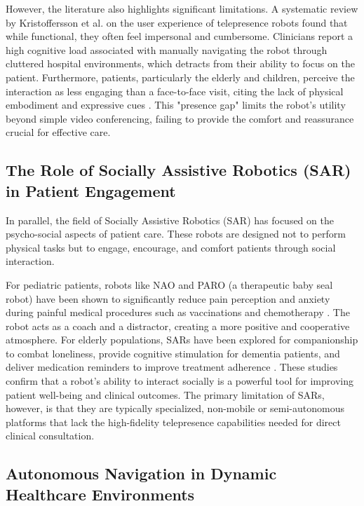 \documentclass[11pt,a4paper]{article}
\begin{document}
However, the literature also highlights significant limitations. A systematic review by Kristoffersson et al. \cite{kristoffersson2013} on the user experience of telepresence robots found that while functional, they often feel impersonal and cumbersome. Clinicians report a high cognitive load associated with manually navigating the robot through cluttered hospital environments, which detracts from their ability to focus on the patient. Furthermore, patients, particularly the elderly and children, perceive the interaction as less engaging than a face-to-face visit, citing the lack of physical embodiment and expressive cues \cite{sabanovic2013}. This "presence gap" limits the robot's utility beyond simple video conferencing, failing to provide the comfort and reassurance crucial for effective care.

\subsection{The Role of Socially Assistive Robotics (SAR) in Patient Engagement}

In parallel, the field of Socially Assistive Robotics (SAR) has focused on the psycho-social aspects of patient care. These robots are designed not to perform physical tasks but to engage, encourage, and comfort patients through social interaction.

For pediatric patients, robots like NAO and PARO (a therapeutic baby seal robot) have been shown to significantly reduce pain perception and anxiety during painful medical procedures such as vaccinations and chemotherapy \cite{beran2013}. The robot acts as a coach and a distractor, creating a more positive and cooperative atmosphere. For elderly populations, SARs have been explored for companionship to combat loneliness, provide cognitive stimulation for dementia patients, and deliver medication reminders to improve treatment adherence \cite{broekens2009}. These studies confirm that a robot's ability to interact socially is a powerful tool for improving patient well-being and clinical outcomes. The primary limitation of SARs, however, is that they are typically specialized, non-mobile or semi-autonomous platforms that lack the high-fidelity telepresence capabilities needed for direct clinical consultation.

\subsection{Autonomous Navigation in Dynamic Healthcare Environments}
\end{document}
